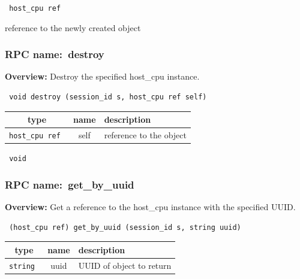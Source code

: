\vspace{0.3cm}

{\tt 
host\_cpu ref
}


reference to the newly created object
\vspace{0.3cm}
\vspace{0.3cm}
\vspace{0.3cm}
\subsubsection{RPC name:~destroy}

{\bf Overview:} 
Destroy the specified host\_cpu instance.

\begin{verbatim} void destroy (session_id s, host_cpu ref self)\end{verbatim}



 
\vspace{0.3cm}
\begin{tabular}{|c|c|p{7cm}|}
 \hline
{\bf type} & {\bf name} & {\bf description} \\ \hline
{\tt host\_cpu ref } & self & reference to the object \\ \hline 

\end{tabular}

\vspace{0.3cm}

{\tt 
void
}



\vspace{0.3cm}
\vspace{0.3cm}
\vspace{0.3cm}
\subsubsection{RPC name:~get\_by\_uuid}

{\bf Overview:} 
Get a reference to the host\_cpu instance with the specified UUID.

\begin{verbatim} (host_cpu ref) get_by_uuid (session_id s, string uuid)\end{verbatim}



 
\vspace{0.3cm}
\begin{tabular}{|c|c|p{7cm}|}
 \hline
{\bf type} & {\bf name} & {\bf description} \\ \hline
{\tt string } & uuid & UUID of object to return \\ \hline 

\end{tabular}

